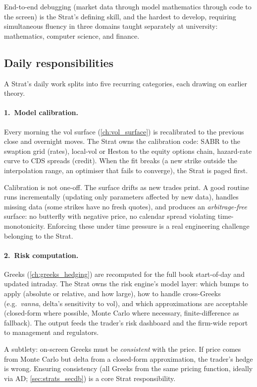 End-to-end debugging (market data through model mathematics
through code to the screen) is the Strat's defining skill, and
the hardest to develop, requiring simultaneous fluency in three
domains taught separately at university: mathematics, computer
science, and finance.

\subsection{Daily responsibilities}

A Strat's daily work splits into five recurring categories, each
drawing on earlier theory.

\paragraph{1.\ Model calibration.}
Every morning the vol surface (\cref{ch:vol_surface}) is
recalibrated to the previous close and overnight moves.  The Strat
owns the calibration code: SABR to the swaption grid (rates),
local-vol or Heston to the equity options chain, hazard-rate curve
to CDS spreads (credit).  When the fit breaks (a new strike
outside the interpolation range, an optimiser that fails to
converge), the Strat is paged first.

Calibration is not one-off.  The surface drifts as new trades print.
A good routine runs incrementally (updating only parameters affected
by new data), handles missing data (some strikes have no fresh
quotes), and produces an \emph{arbitrage-free} surface: no butterfly
with negative price, no calendar spread violating time-monotonicity.
Enforcing these under time pressure is a real engineering challenge
belonging to the Strat.

\paragraph{2.\ Risk computation.}
Greeks (\cref{ch:greeks_hedging}) are recomputed for the full book
start-of-day and updated intraday.  The Strat owns the risk
engine's model layer: which bumps to apply (absolute or relative,
and how large), how to handle cross-Greeks (e.g.\ \emph{vanna},
delta's sensitivity to vol), and which approximations are acceptable
(closed-form where possible, Monte Carlo where necessary,
finite-difference as fallback).  The output feeds the trader's risk
dashboard and the firm-wide report to management and regulators.

A subtlety: on-screen Greeks must be \emph{consistent} with the
price.  If price comes from Monte Carlo but delta from a closed-form
approximation, the trader's hedge is wrong.  Ensuring consistency
(all Greeks from the same pricing function, ideally via AD;
\cref{sec:strats_secdb}) is a core Strat responsibility.


